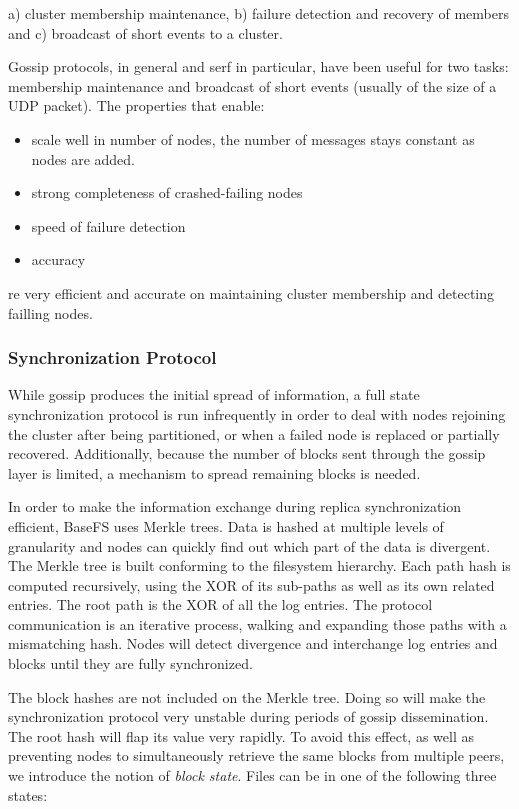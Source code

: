 \documentclass{sig-alternate}
\begin{document}
a) cluster membership maintenance, b) failure detection and recovery of members and c) broadcast of short events to a cluster.



Gossip protocols, in general and serf in particular, have been useful for two tasks: membership maintenance and broadcast of short events (usually of the size of a UDP packet). The properties that enable:

\begin{itemize}
\item scale well in number of nodes, the number of messages stays constant as nodes are added. 
\item strong completeness of crashed-failing nodes
\item speed of failure detection
\item accuracy
\end{itemize}



re very efficient and accurate on maintaining cluster membership and detecting failling nodes.


\subsubsection{Synchronization Protocol}

While gossip produces the initial spread of information, a full state synchronization protocol is run infrequently in order to deal with nodes rejoining the cluster after being partitioned, or when a failed node is replaced or partially recovered. Additionally, because the number of blocks sent through the gossip layer is limited, a mechanism to spread remaining blocks is needed.

In order to make the information exchange during replica synchronization efficient, BaseFS uses Merkle trees. Data is hashed at multiple levels of granularity and nodes can quickly find out which part of the data is divergent. The Merkle tree is built conforming to the filesystem hierarchy. Each path hash is computed recursively, using the XOR of its sub-paths as well as its own related entries. The root path is the XOR of all the log entries. The protocol communication is an iterative process, walking and expanding those paths with a mismatching hash. Nodes will detect divergence and interchange log entries and blocks until they are fully synchronized.

The block hashes are not included on the Merkle tree. Doing so will make the synchronization protocol very unstable during periods of gossip dissemination. The root hash will flap its value very rapidly. To avoid this effect, as well as preventing nodes to simultaneously retrieve the same blocks from multiple peers, we introduce the notion of \textit{block state}. Files can be in one of the following three states:
\end{document}
